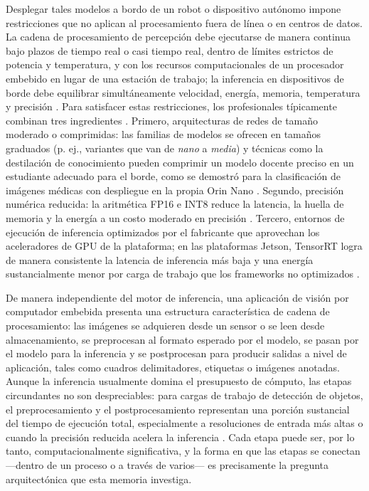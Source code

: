Desplegar tales modelos a bordo de un robot o dispositivo autónomo impone
restricciones que no aplican al procesamiento fuera de línea o en centros de
datos. La cadena de procesamiento de percepción debe ejecutarse de manera
continua bajo plazos de tiempo real o casi tiempo real, dentro de límites
estrictos de potencia y temperatura, y con los recursos computacionales de
un procesador embebido en lugar de una estación de trabajo; la inferencia en
dispositivos de borde debe equilibrar simultáneamente velocidad, energía,
memoria, temperatura y precisión \cite{tang2026}. Para satisfacer estas
restricciones, los profesionales típicamente combinan tres ingredientes
\cite{xu2025, szegedi2026, tang2026}. Primero, arquitecturas de redes de
tamaño moderado o comprimidas: las familias de modelos se ofrecen en tamaños
graduados (p. ej., variantes que van de \emph{nano} a \emph{media}) y
técnicas como la destilación de conocimiento pueden comprimir un modelo
docente preciso en un estudiante adecuado para el borde, como se demostró
para la clasificación de imágenes médicas con despliegue en la propia Orin
Nano \cite{aalishah2025}. Segundo, precisión numérica reducida: la aritmética
FP16 e INT8 reduce la latencia, la huella de memoria y la energía a un costo
moderado en precisión \cite{szegedi2026, tang2026}. Tercero, entornos de
ejecución de inferencia optimizados por el fabricante que aprovechan los
aceleradores de GPU de la plataforma; en las plataformas Jetson, TensorRT
logra de manera consistente la latencia de inferencia más baja y una energía
sustancialmente menor por carga de trabajo que los frameworks no optimizados
\cite{szegedi2026, tang2026}.

De manera independiente del motor de inferencia, una aplicación de visión
por computador embebida presenta una estructura característica de cadena de
procesamiento: las imágenes se adquieren desde un sensor o se leen desde
almacenamiento, se preprocesan al formato esperado por el modelo, se pasan
por el modelo para la inferencia y se postprocesan para producir salidas a
nivel de aplicación, tales como cuadros delimitadores, etiquetas o imágenes
anotadas. Aunque la inferencia usualmente domina el presupuesto de cómputo,
las etapas circundantes no son despreciables: para cargas de trabajo de
detección de objetos, el preprocesamiento y el postprocesamiento representan
una porción sustancial del tiempo de ejecución total, especialmente a
resoluciones de entrada más altas o cuando la precisión reducida acelera la
inferencia \cite{szegedi2026}. Cada etapa puede ser, por lo tanto,
computacionalmente significativa, y la forma en que las etapas se
conectan---dentro de un proceso o a través de varios--- es precisamente la
pregunta arquitectónica que esta memoria investiga.


